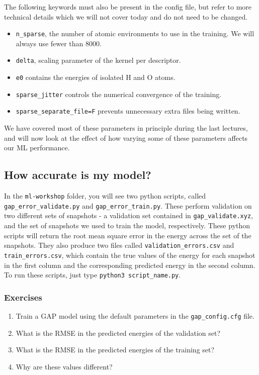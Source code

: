 \documentclass{article}
\begin{document}
The following keywords must also be present in the config file, but refer to more technical details which we will not cover today and do not need to be changed.

\begin{itemize}
\item \verb|n_sparse|, the number of atomic environments to use in the training. We will always use fewer than 8000.
\item \verb|delta|, scaling parameter of the kernel per descriptor.
\item \verb|e0| contains the energies of isolated H and O atoms.
\item \verb|sparse_jitter| controls the numerical convergence of the training.
\item \verb|sparse_separate_file=F| prevents unnecessary extra files being written. 
\end{itemize}

We have covered most of these parameters in principle during the last lectures, and will now look at the effect of how varying some of these parameters affects our ML performance.

\subsection{How accurate is my model?}

In the \verb|ml-workshop| folder, you will see two python scripts, called \verb|gap_error_validate.py| and \verb|gap_error_train.py|. These perform validation on two different sets of snapshots - a validation set contained in \verb|gap_validate.xyz|, and the set of snapshots we used to train the model, respectively. These python scripts will return the root mean square error in the energy across the set of the snapshots. They also produce two files called \verb|validation_errors.csv| and \verb|train_errors.csv|, which contain the true values of the energy for each snapshot in the first column and the corresponding predicted energy in the second column. To run these scripts, just type \verb|python3 script_name.py|.

\subsubsection*{Exercises}

\begin{enumerate}
 
\item Train a GAP model using the default parameters in the \verb|gap_config.cfg| file.
\item What is the RMSE in the predicted energies of the validation set?
\item What is the RMSE in the predicted energies of the training set?
\item Why are these values different?
\end{enumerate}
\end{document}
